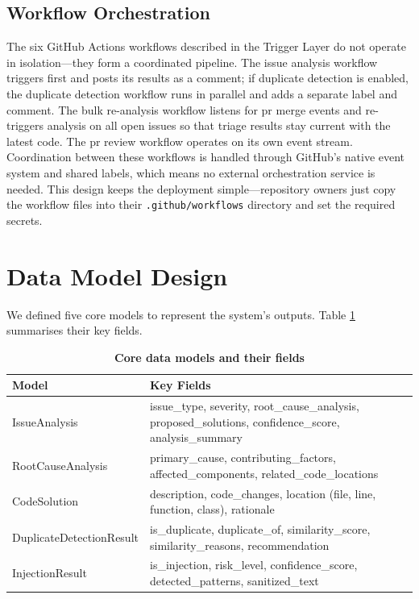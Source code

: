 \subsection{Workflow Orchestration}
The six GitHub Actions workflows described in the Trigger Layer do not operate in isolation---they form a coordinated pipeline. The issue analysis workflow triggers first and posts its results as a comment; if duplicate detection is enabled, the duplicate detection workflow runs in parallel and adds a separate label and comment. The bulk re-analysis workflow listens for \gls{pr} merge events and re-triggers analysis on all open issues so that triage results stay current with the latest code. The \gls{pr} review workflow operates on its own event stream. Coordination between these workflows is handled through GitHub's native event system and shared labels, which means no external orchestration service is needed. This design keeps the deployment simple---repository owners just copy the workflow files into their \texttt{.github/workflows} directory and set the required secrets.

\section{Data Model Design}

We defined five core models to represent the system's outputs. Table \ref{tab:models} summarises their key fields.

\begin{table}[htb]
\centering
\renewcommand{\arraystretch}{1.3}
\setlength{\arrayrulewidth}{0.5mm}
\fontsize{10}{12}\selectfont
\caption[Core data models and their fields]{\textbf{Core data models and their fields}}
\vspace{2mm}
\label{tab:models}
\begin{tabular}{|p{3.8cm}|p{8cm}|}
\hline
\textbf{Model} & \textbf{Key Fields} \\
\hline
IssueAnalysis & issue\_type, severity, root\_cause\_analysis, proposed\_solutions, confidence\_score, analysis\_summary \\
\hline
RootCauseAnalysis & primary\_cause, contributing\_factors, affected\_components, related\_code\_locations \\
\hline
CodeSolution & description, code\_changes, location (file, line, function, class), rationale \\
\hline
DuplicateDetectionResult & is\_duplicate, duplicate\_of, similarity\_score, similarity\_reasons, recommendation \\
\hline
InjectionResult & is\_injection, risk\_level, confidence\_score, detected\_patterns, sanitized\_text \\
\hline
\end{tabular}
\end{table}

